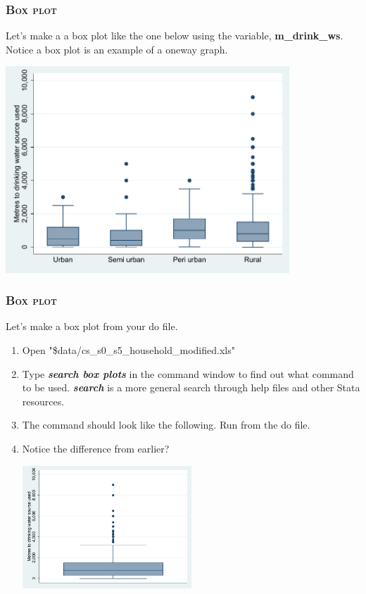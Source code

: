\documentclass[10pt]{beamer}
\begin{document}
	\begin{frame}
	\frametitle{\textsc{Box plot}}
		Let's make a a box plot like the one below using the variable, \textbf{m\_drink\_ws}.
		Notice a box plot is an example of a oneway graph. 
\begin{center}
    \includegraphics[width=0.8\textwidth]{boxplot_1.pdf}
\end{center}
	\end{frame}
	
	\begin{frame}
	\frametitle{\textsc{Box plot}}	
		 Let's make a box plot from your do file.
		\begin{enumerate}
			 \item Open "\$data/cs\_s0\_s5\_household\_modified.xls"
			 \item Type \textbf{\textit{search box plots}} in the command window to find out what command to be used.
					\textbf{\textit{search}} is a more general search through help files and other Stata resources.
			 \onslide<2-> \item The command should look like the following. Run from the do file.
		
\begin{stlog}\end{stlog}
			\vspace{1mm}
			 \item Notice the difference from earlier? 
			\vspace{1mm}			
		
\begin{center}
    \includegraphics[width=0.5\textwidth]{boxplot_2.pdf}
\end{center}
		\end{enumerate}
	\end{frame}
\end{document}
